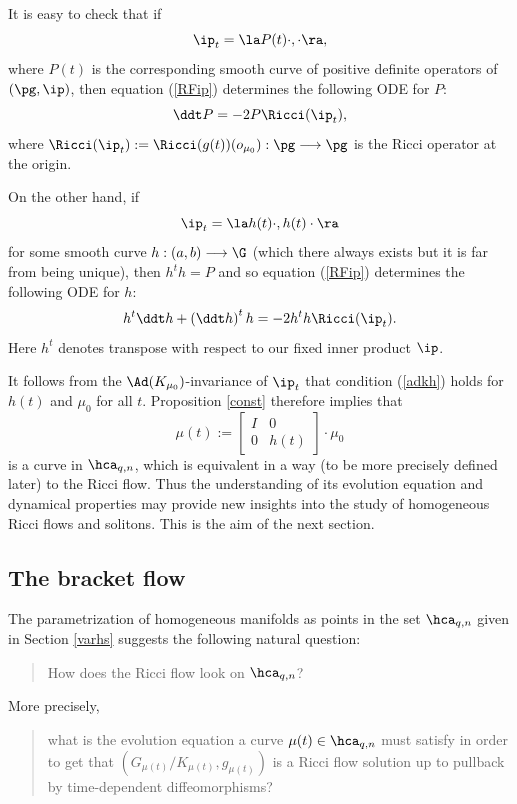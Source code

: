 \documentclass[11pt]{amsart}
\theoremstyle{plain}
\theoremstyle{definition}
\theoremstyle{remark}
\begin{document}
It is easy to check that if
$$
\ip_t=\la P(t)\cdot,\cdot\ra,
$$
where $P(t)$ is the corresponding smooth curve of positive definite operators of $(\pg,\ip)$, then equation (\ref{RFip}) determines the following
ODE for $P$:
\begin{equation}\label{RFP}
\ddt P=-2P\Ricci(\ip_t),
\end{equation}
where $\Ricci(\ip_t):=\Ricci(g(t))(o_{\mu_0}):\pg\longrightarrow\pg$ is the Ricci operator at the origin.

On the other hand, if
$$
\ip_t=\la h(t)\cdot,h(t)\cdot\ra
$$
for some smooth curve $h:(a,b)\longrightarrow\G$ (which there always exists but
it is far from being unique), then $h^th=P$ and so equation (\ref{RFip}) determines the following
ODE for $h$:
\begin{equation}\label{RFh}
h^t\ddt h+\left(\ddt h\right)^th=-2h^th\Ricci(\ip_t).
\end{equation}
Here $h^t$ denotes transpose with respect to our fixed inner product $\ip$.

It follows from the $\Ad(K_{\mu_0})$-invariance of $\ip_t$ that condition (\ref{adkh}) holds for $h(t)$ and $\mu_0$ for all $t$.  Proposition \ref{const} therefore implies that
$$
\mu(t):=\left[\begin{smallmatrix} I&0\\ 0&h(t)\end{smallmatrix}\right]\cdot\mu_0
$$
is a curve in $\hca_{q,n}$, which is equivalent in a way (to be more precisely defined later) to the Ricci flow.  Thus the understanding of its evolution equation and dynamical properties may provide new insights into the study of homogeneous Ricci flows and solitons.  This is the aim of the next section.







\subsection{The bracket flow}\label{lbflow}
The parametrization of homogeneous manifolds as points in the set $\hca_{q,n}$ given in Section \ref{varhs} suggests the following natural question:

\begin{quote}
How does the Ricci flow look on $\hca_{q,n}$?
\end{quote}

More precisely,

\begin{quote}
what is the evolution equation a curve $\mu(t)\in\hca_{q,n}$ must satisfy in order to get that $\left(G_{\mu(t)}/K_{\mu(t)},g_{\mu(t)}\right)$ is a Ricci flow solution up to pullback by time-dependent diffeomorphisms?
\end{quote}
\end{document}
